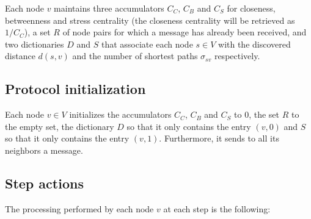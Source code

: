 Each node $v$ maintains three accumulators $C_C$, $C_B$ and $C_S$ for closeness, betweenness and stress centrality (the closeness centrality will be retrieved as $1/C_C$), a set $R$ of node pairs for which a \mrep{} message has already been received, and two dictionaries $D$ and $S$ that associate each node $s \in V$ with the discovered distance $d(s,v)$ and the number of shortest paths $\sigma_{sv}$ respectively.

\subsection{Protocol initialization}

Each node $v \in V$ initializes the accumulators $C_C$, $C_B$ and $C_S$ to $0$, the set $R$ to the empty set, the dictionary $D$ so that it only contains the entry $(v,0)$ and $S$ so that it only contains the entry $(v,1)$. Furthermore, it sends to all its neighbors a  message.

\subsection{Step actions}
\label{deccen:step}
The processing performed by each node $v$ at each step is the following:

